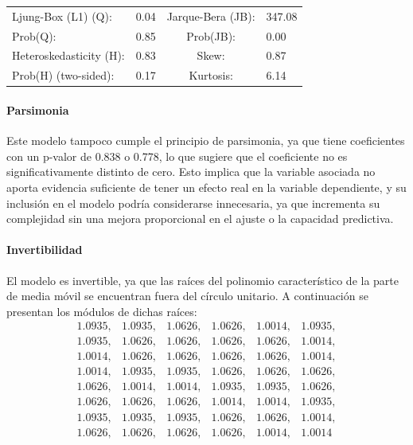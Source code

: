 \documentclass[12pt,letterpaper]{article}   %
\begin{document}
\begin{table}[htbp]
\vspace{0.3cm}

\begin{tabular}{llcl}
\toprule
Ljung-Box (L1) (Q): & 0.04 & Jarque-Bera (JB): & 347.08 \\
Prob(Q): & 0.85 & Prob(JB): & 0.00 \\
Heteroskedasticity (H): & 0.83 & Skew: & 0.87 \\
Prob(H) (two-sided): & 0.17 & Kurtosis: & 6.14 \\
\bottomrule
\end{tabular}

\end{table}











\paragraph{Parsimonia}
Este modelo tampoco cumple el principio de parsimonia, ya que tiene coeficientes con un p-valor de 0.838 o 0.778, lo que sugiere que el coeficiente no es significativamente distinto de cero. Esto implica que la variable asociada no aporta evidencia suficiente de tener un efecto real en la variable dependiente, y su inclusión en el modelo podría considerarse innecesaria, ya que incrementa su complejidad sin una mejora proporcional en el ajuste o la capacidad predictiva.


\paragraph{Invertibilidad}
El modelo es invertible, ya que las raíces del polinomio característico de la parte de media móvil se encuentran fuera del círculo unitario. A continuación se presentan los módulos de dichas raíces:
\[
\begin{array}{cccccc}
1.0935, & 1.0935, & 1.0626, & 1.0626, & 1.0014, & 1.0935, \\
1.0935, & 1.0626, & 1.0626, & 1.0626, & 1.0626, & 1.0014, \\
1.0014, & 1.0626, & 1.0626, & 1.0626, & 1.0626, & 1.0014, \\
1.0014, & 1.0935, & 1.0935, & 1.0626, & 1.0626, & 1.0626, \\
1.0626, & 1.0014, & 1.0014, & 1.0935, & 1.0935, & 1.0626, \\
1.0626, & 1.0626, & 1.0626, & 1.0014, & 1.0014, & 1.0935, \\
1.0935, & 1.0935, & 1.0935, & 1.0626, & 1.0626, & 1.0014, \\
1.0626, & 1.0626, & 1.0626, & 1.0626, & 1.0014, & 1.0014
\end{array}
\]
\end{document}

